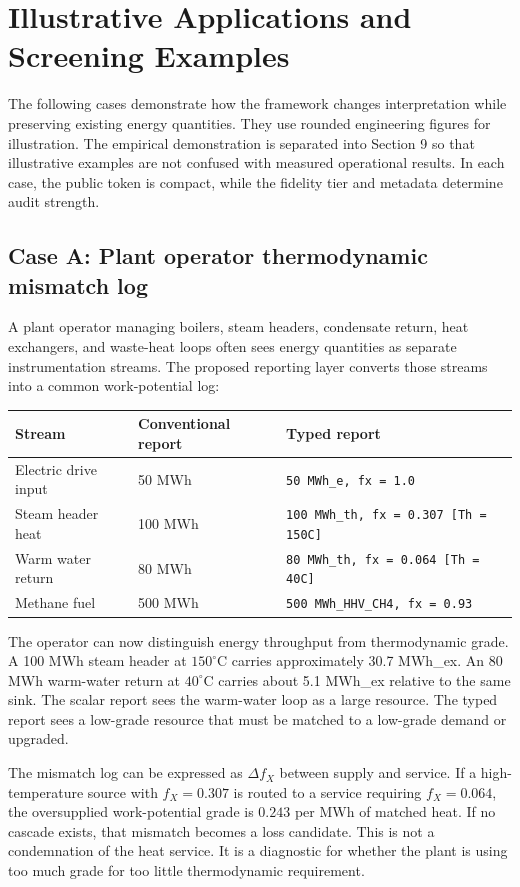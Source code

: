 \documentclass[11pt]{article}
\newcommand{\fx}{f_X}
\newcommand{\degC}{^{\circ}\mathrm{C}}
\begin{document}
\section{Illustrative Applications and Screening Examples}

The following cases demonstrate how the framework changes interpretation while preserving existing energy quantities. They use rounded engineering figures for illustration. The empirical demonstration is separated into Section 9 so that illustrative examples are not confused with measured operational results. In each case, the public token is compact, while the fidelity tier and metadata determine audit strength.

\subsection*{Case A: Plant operator thermodynamic mismatch log}

A plant operator managing boilers, steam headers, condensate return, heat exchangers, and waste-heat loops often sees energy quantities as separate instrumentation streams. The proposed reporting layer converts those streams into a common work-potential log:

\begin{center}
\begin{tabular}{@{}lll@{}}
\toprule
Stream & Conventional report & Typed report \\
\midrule
Electric drive input & 50 MWh & \texttt{50 MWh\_e, fx = 1.0} \\
Steam header heat & 100 MWh & \texttt{100 MWh\_th, fx = 0.307 [Th = 150C]} \\
Warm water return & 80 MWh & \texttt{80 MWh\_th, fx = 0.064 [Th = 40C]} \\
Methane fuel & 500 MWh & \texttt{500 MWh\_HHV\_CH4, fx = 0.93} \\
\bottomrule
\end{tabular}
\end{center}

The operator can now distinguish energy throughput from thermodynamic grade. A 100 MWh steam header at $150\degC$ carries approximately 30.7 MWh\_ex. An 80 MWh warm-water return at $40\degC$ carries about 5.1 MWh\_ex relative to the same sink. The scalar report sees the warm-water loop as a large resource. The typed report sees a low-grade resource that must be matched to a low-grade demand or upgraded.

The mismatch log can be expressed as $\Delta \fx$ between supply and service. If a high-temperature source with $\fx=0.307$ is routed to a service requiring $\fx=0.064$, the oversupplied work-potential grade is $0.243$ per MWh of matched heat. If no cascade exists, that mismatch becomes a loss candidate. This is not a condemnation of the heat service. It is a diagnostic for whether the plant is using too much grade for too little thermodynamic requirement.
\end{document}
